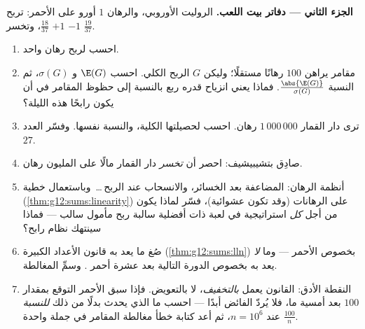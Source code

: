 \begin{problem}
\medskip
\noindent\textbf{الجزء الثاني --- دفاتر بيت اللعب.}
الروليت الأوروبي، والرهان $1$ أورو على الأحمر: تربح $+1$
 $\frac{18}{37}$، وتخسر $-1$ 
$\frac{19}{37}$.
\begin{enumerate}[resume]
  \item احسب   لربح رهان
        واحد.
  \item مقامر يراهن $100$ رهانًا مستقلًا؛ وليكن $G$ الربح
        الكلي. احسب $\E(G)$ و $\sigma(G)$، ثم
        النسبة $\frac{\abs{\E(G)}}{\sigma(G)}$. فماذا يعني انزياح
        قدره ربع  بالنسبة إلى
        حظوظ المقامر في أن يكون رابحًا هذه الليلة؟
  \item ترى دار القمار $1\,000\,000$ رهان. احسب
          لحصيلتها الكلية،
        والنسبة نفسها. وفسّر العدد $27$.
  \item صادِق بتشيبيشيف: احصر  أن \emph{تخسر}
        دار القمار مالًا على المليون رهان.
  \item أنظمة الرهان: المضاعفة بعد الخسائر، والانسحاب عند
        الربح\,\dots\ وباستعمال خطية 
        (\cref{thm:g12:sums:linearity}) على  الرهانات (وقد
        تكون عشوائية)، فسّر لماذا يكون من أجل \emph{كل}
        استراتيجية في لعبة ذات أفضلية سالبة ربح مأمول سالب ---
        فماذا سينتهك نظام رابح؟
  \item صُغ ما يعد به قانون الأعداد الكبيرة
        (\cref{thm:g12:sums:lln}) بخصوص 
        الأحمر --- وما \emph{لا} يعد به بخصوص
        الدورة التالية بعد عشرة أحمر . وسمِّ
        المغالطة.
  \item النقطة الأدق: القانون يعمل \emph{بالتخفيف}،
        لا بالتعويض. فإذا سبق الأحمر التوقع بمقدار $100$
        بعد أمسية ما، فلا يُردّ الفائض
        أبدًا --- احسب ما الذي يحدث بدلًا من ذلك \emph{للنسبة}
        $\frac{100}{n}$ عند $n = 10^6$، ثم
        أعد كتابة خطأ مغالطة المقامر في جملة واحدة.
\end{enumerate}


\end{problem}

